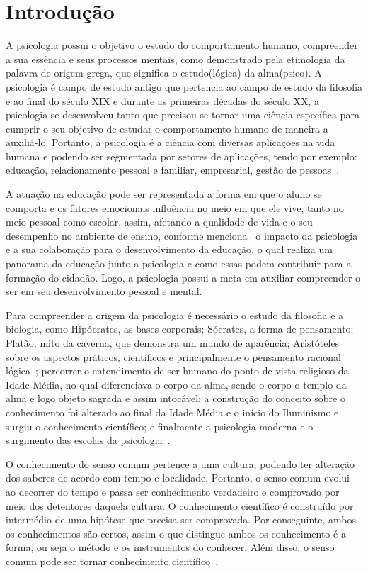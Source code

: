 \section{Introdução}\label{intro}


A psicologia possui o objetivo o estudo do comportamento humano, compreender a sua
essência e seus processos mentais, como demonstrado pela etimologia da palavra de origem grega, que significa o estudo(lógica) da alma(psico). 
A psicologia é campo de estudo antigo que pertencia ao campo de estudo da filosofia e ao final do século XIX e durante as primeiras décadas do século XX, a psicologia se desenvolveu tanto que precisou se tornar uma ciência específica para cumprir o seu objetivo de estudar o comportamento humano de maneira a auxiliá-lo. 
Portanto, a psicologia é a ciência com diversas aplicações na vida humana e podendo ser segmentada por setores de aplicações, tendo por exemplo: educação, relacionamento pessoal e familiar, empresarial, gestão de pessoas~\cite{freitas2008historia}.

A atuação na educação pode ser representada a forma em que o aluno se comporta e os fatores emocionais influência no meio em que ele vive, tanto no meio pessoal como escolar, assim, afetando a qualidade de vida e o seu desempenho no ambiente de ensino, conforme menciona~ o impacto da psicologia e a sua colaboração para o desenvolvimento da educação, o qual realiza um panorama da educação junto a psicologia e como essas podem contribuir para a formação do cidadão.
Logo, a psicologia possui a meta em auxiliar compreender o ser em seu desenvolvimento pessoal e mental. 

Para compreender a origem da psicologia é necessário o estudo da filosofia e a biologia, como Hipócrates, as bases corporais; Sócrates, a forma de pensamento; Platão, mito da caverna, que demonstra um mundo de aparência; Aristóteles sobre os aspectos práticos, científicos e principalmente o pensamento racional lógica~\cite{marcondes1997filosofia}; percorrer o entendimento de ser humano do ponto de vista religioso da Idade Média, no qual diferenciava o corpo da alma, sendo o corpo o templo da alma e logo objeto sagrada e assim intocável; a construção do conceito sobre o conhecimento foi alterado ao final da Idade Média e o início do Iluminismo e surgiu o conhecimento científico; e finalmente a psicologia moderna e o surgimento das escolas da psicologia~\cite{bock1999psicologias,freitas2008historia}. 

O conhecimento do senso comum pertence a uma cultura, podendo ter alteração dos saberes de acordo com tempo e localidade.
Portanto, o senso comum evolui ao decorrer do tempo e passa ser conhecimento verdadeiro e comprovado por meio dos detentores daquela cultura.
O conhecimento científico é construído por intermédio de uma hipótese que precisa ser comprovada. 
Por conseguinte, ambos os conhecimentos são certos, assim o que distingue ambos os conhecimento é a forma, ou seja o método e os instrumentos do conhecer.
Além disso, o senso comum pode ser tornar conhecimento científico~\cite{marconi2003mep}.  

